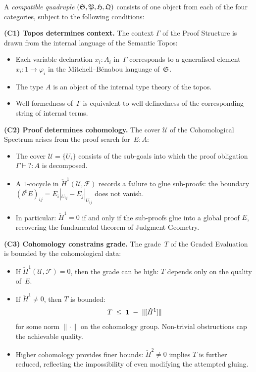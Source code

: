 \begin{definition}
\label{def:compatible}
A \emph{compatible quadruple} $(\mathfrak{S}, \mathfrak{P}, \mathfrak{H}, \mathfrak{Q})$
consists of one object from each of the four categories, subject to the
following conditions:

\medskip
\noindent\textbf{(C1) Topos determines context.}
The context $\Gamma$ of the Proof Structure is drawn from the internal
language of the Semantic Topos:
\begin{itemize}[nosep]
\item Each variable declaration $x_i : A_i$ in~$\Gamma$ corresponds to
  a generalised element $x_i : 1 \to \varphi_i$ in the
  Mitchell--B\'enabou language of~$\mathfrak{S}$.
\item The type $A$ is an object of the internal type theory of the
  topos.
\item Well-formedness of~$\Gamma$ is equivalent to well-definedness
  of the corresponding string of internal terms.
\end{itemize}

\medskip
\noindent\textbf{(C2) Proof determines cohomology.}
The cover $\mathcal{U}$ of the Cohomological Spectrum arises from
the proof search for~$E : A$:
\begin{itemize}[nosep]
\item The cover $\mathcal{U} = \{U_i\}$ consists of the sub-goals into
  which the proof obligation $\Gamma \vdash ? : A$ is decomposed.
\item A $1$-cocycle in $\check{H}^1(\mathcal{U}, \mathcal{F})$ records
  a failure to glue sub-proofs: the boundary
  $(\delta^0 E)_{ij} = E_i|_{U_{ij}} - E_j|_{U_{ij}}$ does not
  vanish.
\item In particular: $\check{H}^1 = 0$ if and only if the sub-proofs
  glue into a global proof $E$, recovering the fundamental theorem of
  Judgment Geometry.
\end{itemize}

\medskip
\noindent\textbf{(C3) Cohomology constrains grade.}
The grade~$T$ of the Graded Evaluation is bounded by the cohomological
data:
\begin{itemize}[nosep]
\item If $\check{H}^1(\mathcal{U}, \mathcal{F}) = 0$, then the grade
  can be high: $T$ depends only on the quality of~$E$.
\item If $\check{H}^1 \neq 0$, then $T$ is bounded:
  \[
    T \;\leq\; \mathbf{1} \;-\; \|[\check{H}^1]\|
  \]
  for some norm $\|\cdot\|$ on the cohomology group.  Non-trivial
  obstructions cap the achievable quality.
\item Higher cohomology provides finer bounds:
  $\check{H}^2 \neq 0$ implies $T$ is further reduced, reflecting
  the impossibility of even modifying the attempted gluing.
\end{itemize}


\end{definition}
